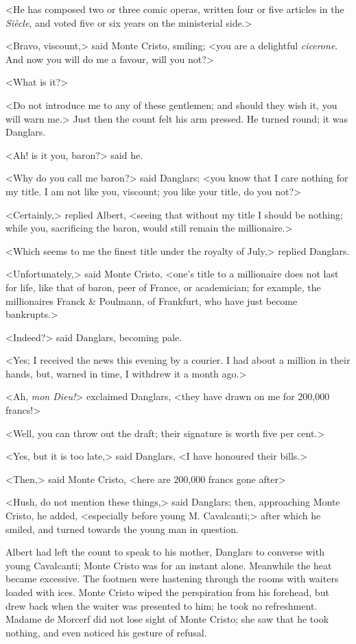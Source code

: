  <He has composed two or three comic operas, written four or five articles in the \textit{Siècle}, and voted five or six years on the ministerial side.> 

 <Bravo, viscount,> said Monte Cristo, smiling; <you are a delightful \textit{cicerone}. And now you will do me a favour, will you not?> 

 <What is it?> 

 <Do not introduce me to any of these gentlemen; and should they wish it, you will warn me.> Just then the count felt his arm pressed. He turned round; it was Danglars. 

 <Ah! is it you, baron?> said he. 

 <Why do you call me baron?> said Danglars; <you know that I care nothing for my title. I am not like you, viscount; you like your title, do you not?> 

 <Certainly,> replied Albert, <seeing that without my title I should be nothing; while you, sacrificing the baron, would still remain the millionaire.> 

 <Which seems to me the finest title under the royalty of July,> replied Danglars. 

 <Unfortunately,> said Monte Cristo, <one's title to a millionaire does not last for life, like that of baron, peer of France, or academician; for example, the millionaires Franck \& Poulmann, of Frankfurt, who have just become bankrupts.> 

 <Indeed?> said Danglars, becoming pale. 

 <Yes; I received the news this evening by a courier. I had about a million in their hands, but, warned in time, I withdrew it a month ago.> 

 <Ah, \textit{mon Dieu!}> exclaimed Danglars, <they have drawn on me for 200,000 francs!> 

 <Well, you can throw out the draft; their signature is worth five per cent.> 

 <Yes, but it is too late,> said Danglars, <I have honoured their bills.> 

 <Then,> said Monte Cristo, <here are 200,000 francs gone after\longdash> 

 <Hush, do not mention these things,> said Danglars; then, approaching Monte Cristo, he added, <especially before young M. Cavalcanti;> after which he smiled, and turned towards the young man in question. 

 Albert had left the count to speak to his mother, Danglars to converse with young Cavalcanti; Monte Cristo was for an instant alone. Meanwhile the heat became excessive. The footmen were hastening through the rooms with waiters loaded with ices. Monte Cristo wiped the perspiration from his forehead, but drew back when the waiter was presented to him; he took no refreshment. Madame de Morcerf did not lose sight of Monte Cristo; she saw that he took nothing, and even noticed his gesture of refusal. 

